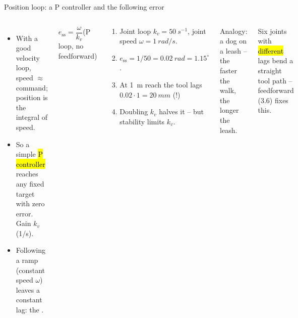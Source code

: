 \documentclass[aspectratio=169,10pt]{beamer}
\begin{document}
\begin{frame}[t]{Position loop: a P controller and the following error}
\begin{columns}[T,onlytextwidth]
\begin{itemize}\small
\item With a good velocity loop, speed $\approx$ command; position is the integral of speed.
\item So a simple \hl{P controller} reaches any fixed target with zero error. Gain $k_v$ (1/s).
\item Following a ramp (constant speed $\omega$) leaves a constant lag: the .
\end{itemize}
\begin{eqbox}\centering
$e_\text{ss}=\dfrac{\omega}{k_v}$\qquad (P loop, no feedforward)
\end{eqbox}
\begin{defbox}
\small
\begin{enumerate}
\item Joint loop $k_v=\SI{50}{s^{-1}}$, joint speed $\omega=\SI{1}{rad/s}$.
\item $e_\text{ss}=1/50=\SI{0.02}{rad}=1.15^\circ$.
\item At \SI{1}{m} reach the tool lags $0.02\cdot1=\SI{20}{mm}$ (!)
\item Doubling $k_v$ halves it -- but stability limits $k_v$.
\end{enumerate}
\end{defbox}
\small Analogy: a dog on a leash -- the faster the walk, the longer the leash.\\[1mm]
\begin{notebox}
Six joints with \hl{different} lags bend a straight tool path -- feedforward (3.6) fixes this.
\end{notebox}
\end{columns}
\end{frame}
\end{document}
